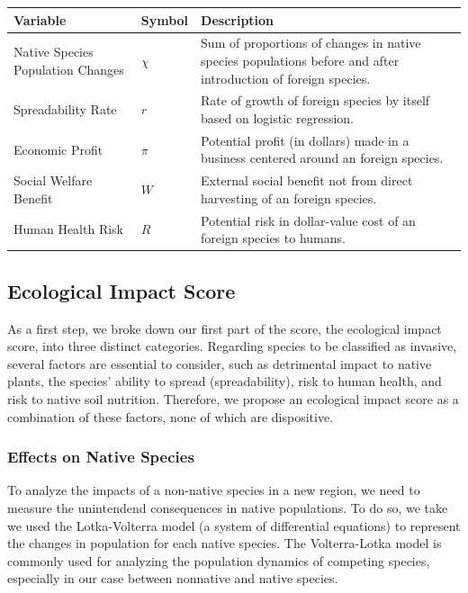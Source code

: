 \begin{table}[h!]
\renewcommand{\arraystretch}{1.3}
    \begin{tabularx}{\textwidth}{p{}lX}
    \toprule
    \textbf{Variable}           & \textbf{Symbol} & \textbf{Description}  \\ \midrule
    \raggedright Native Species Population Changes & $\chi$  & Sum of proportions of changes in native species populations before and after introduction of foreign species. \\
    \rowcolor{gray!15}
    \raggedright Spreadability Rate  & $r$  & Rate of growth of foreign species by itself based on logistic regression. \\
    Economic Profit & $\pi$  & Potential profit (in dollars) made in a business centered around an foreign species. \\
    \rowcolor{gray!15} \raggedright Social Welfare Benefit& $W$   &  External social benefit not from direct harvesting of an foreign species. \\
    \raggedright Human Health Risk & $R$ & Potential risk in dollar-value cost of an foreign species to humans.\\
    \bottomrule
    \end{tabularx}
\end{table}

\subsection{Ecological Impact Score}

As a first step, we broke down our first part of the score, the ecological impact score, into three distinct categories. Regarding species to be classified as invasive, several factors are essential to consider, such as detrimental impact to native plants, the species' ability to spread (spreadability), risk to human health, and risk to native soil nutrition. Therefore, we propose an ecological impact score as a combination of these factors, none of which are dispositive. 

\subsubsection{Effects on Native Species}

To analyze the impacts of a non-native species in a new region, we need to measure the unintendend consequences in native populations. To do so, we take we used the Lotka-Volterra model (a system of differential equations) to represent the changes in population for each native species. The Volterra-Lotka model is commonly used for analyzing the population dynamics of competing species, especially in our case between nonnative and native species. 

